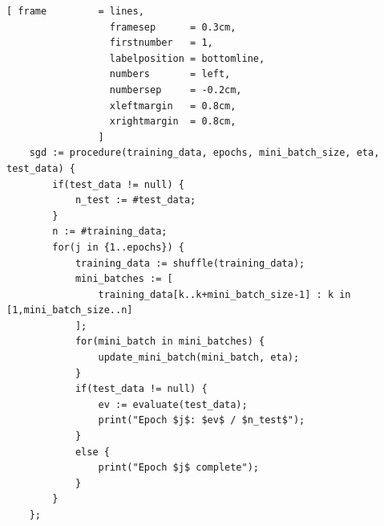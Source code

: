\begin{Verbatim}[ frame         = lines, 
                  framesep      = 0.3cm, 
                  firstnumber   = 1,
                  labelposition = bottomline,
                  numbers       = left,
                  numbersep     = -0.2cm,
                  xleftmargin   = 0.8cm,
                  xrightmargin  = 0.8cm,
                ]
    sgd := procedure(training_data, epochs, mini_batch_size, eta, test_data) {
        if(test_data != null) {
            n_test := #test_data; 		
        }
        n := #training_data;		
        for(j in {1..epochs}) {
            training_data := shuffle(training_data);
            mini_batches := [ 
                training_data[k..k+mini_batch_size-1] : k in [1,mini_batch_size..n] 
            ];		
            for(mini_batch in mini_batches) {
                update_mini_batch(mini_batch, eta);
            } 		
            if(test_data != null) {
                ev := evaluate(test_data);
                print("Epoch $j$: $ev$ / $n_test$");
            }
            else {
                print("Epoch $j$ complete");
            }
        }
    };
\end{Verbatim}
